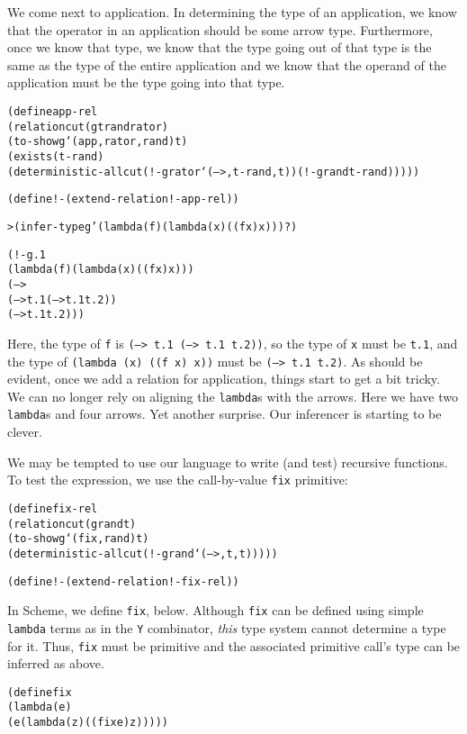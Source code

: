 We come next to application.  In determining the type of an
application, we know that the operator in an application should be
some arrow type.  Furthermore, once we know that type, we know that
the type going out of that type is the same as the type of the entire
application and we know that the operand of the application must be
the type going into that type.  
\newpage
\begin{alltt}
(define app-rel
  (relation cut (g t rand rator)
    (to-show g `(app ,rator ,rand) t)
    (exists (t-rand)
      (deterministic-all cut (!- g rator `(--> ,t-rand ,t)) (!- g rand t-rand)))))

(define !- (extend-relation !- app-rel))
\end{alltt}

\begin{alltt}
> (infer-type g '(lambda (f) (lambda (x) ((f x) x))) ?)

(!- g.1
    (lambda (f) (lambda (x) ((f x) x)))
    (-->
      (--> t.1 (--> t.1 t.2))
      (--> t.1 t.2)))
\end{alltt}

Here, the type of \texttt{f} is \texttt{(--> t.1 (--> t.1 t.2))}, so
the type of \texttt{x} must be \texttt{t.1}, and the type of
\texttt{(lambda (x) ((f x) x))} must be \texttt{(--> t.1 t.2)}.
As should be evident, once we add a relation for application, things
start to get a bit tricky.  We can no longer rely on aligning the
\texttt{lambda}s with the arrows.  Here we have two \texttt{lambda}s
and four arrows.  Yet another surprise.  Our inferencer is starting
to be clever.

We may be tempted to use our language to write (and test) recursive
functions.  To test the expression, we use the call-by-value \texttt{fix}
primitive:

\begin{alltt}
(define fix-rel
  (relation cut (g rand t)
    (to-show g `(fix ,rand) t)
    (deterministic-all cut (!- g rand `(--> ,t ,t)))))

(define !- (extend-relation !- fix-rel))
\end{alltt}

In Scheme, we define \texttt{fix}, below.  Although \texttt{fix} can
be defined using simple \texttt{lambda} terms as in the \texttt{Y}
combinator, \emph{this} type system cannot determine a type for it.
Thus, \texttt{fix} must be primitive and the associated primitive
call's type can be inferred as above.

\begin{alltt}
(define fix
  (lambda (e)
    (e (lambda (z) ((fix e) z)))))
\end{alltt}

